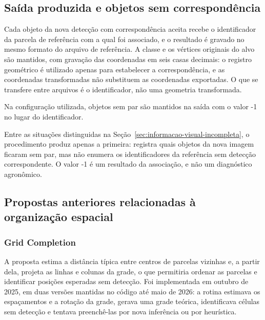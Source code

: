 \subsection{Sa\'ida produzida e objetos sem correspond\^encia}
\label{sec:saida-produzida-objetos-sem-correspondencia}

Cada objeto da nova detec\c{c}\~ao com correspond\^encia aceita recebe o identificador da parcela de refer\^encia com a qual foi associado, e o resultado \'e gravado no mesmo formato do arquivo de refer\^encia. A classe e os v\'ertices originais do alvo s\~ao mantidos, com grava\c{c}\~ao das coordenadas em seis casas decimais: o registro geom\'etrico \'e utilizado apenas para estabelecer a correspond\^encia, e as coordenadas transformadas n\~ao substituem as coordenadas exportadas. O que se transfere entre arquivos \'e o identificador, n\~ao uma geometria transformada.

Na configura\c{c}\~ao utilizada, objetos sem par s\~ao mantidos na sa\'ida com o valor -1 no lugar do identificador.

Entre as situa\c{c}\~oes distinguidas na Se\c{c}\~ao~\ref{sec:informacao-visual-incompleta}, o procedimento produz apenas a primeira: registra quais objetos da nova imagem ficaram sem par, mas n\~ao enumera os identificadores da refer\^encia sem detec\c{c}\~ao correspondente. O valor -1 \'e um resultado da associa\c{c}\~ao, e n\~ao um diagn\'ostico agron\^omico.

\subsection{Propostas anteriores relacionadas \`a organiza\c{c}\~ao espacial}
\label{sec:propostas-anteriores-organizacao}

\subsubsection*{Grid Completion}

A proposta estima a dist\^ancia t\'ipica entre centros de parcelas vizinhas e, a partir dela, projeta as linhas e colunas da grade, o que permitiria ordenar as parcelas e identificar posi\c{c}\~oes esperadas sem detec\c{c}\~ao. Foi implementada em outubro de 2025, em duas vers\~oes mantidas no c\'odigo at\'e maio de 2026: a rotina estimava os espa\c{c}amentos e a rota\c{c}\~ao da grade, gerava uma grade te\'orica, identificava c\'elulas sem detec\c{c}\~ao e tentava preench\^e-las por nova infer\^encia ou por heur\'istica.

